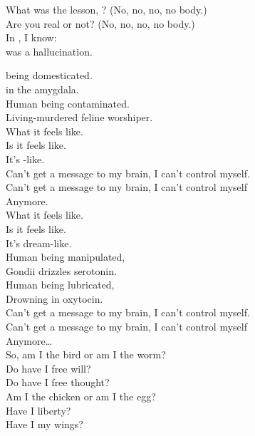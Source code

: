What was the lesson, ? (No, no, no, no body.) \\
Are you real or not? (No, no, no, no body.) \\

In , I know: \\
 was a hallucination. \\





 being domesticated. \\
 in the amygdala. \\
Human being contaminated. \\
Living-murdered feline worshiper. \\

What it feels like. \\
Is it feels like. \\
It's -like. \\

Can't get a message to my brain, I can't control myself. \\
Can't get a message to my brain, I can't control myself \\
Anymore. \\

What it feels like. \\
Is it feels like. \\
It's dream-like. \\

Human being manipulated, \\
Gondii drizzles serotonin. \\
Human being lubricated, \\
Drowning in oxytocin. \\

Can't get a message to my brain, I can't control myself. \\
Can't get a message to my brain, I can't control myself \\
Anymore… \\

So, am I the bird or am I the worm? \\
Do have I free will? \\
Do have I free thought? \\
Am I the chicken or am I the egg? \\
Have I liberty? \\
Have I my wings? \\

